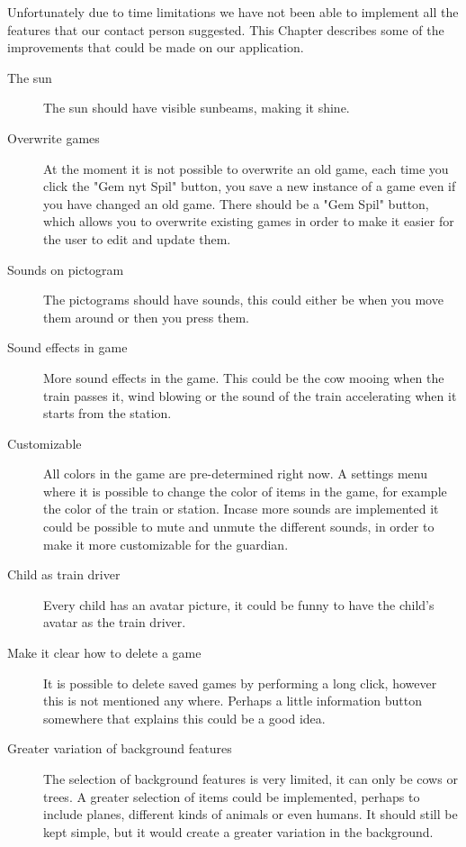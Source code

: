 Unfortunately due to time limitations we have not been able to implement all the features that our contact person suggested. This Chapter describes some of the improvements that could be made on our application.

\begin{description}
\item[The sun] The sun should have visible sunbeams, making it shine. 

\item[Overwrite games] At the moment it is not possible to overwrite an old game, each time you click the "Gem nyt Spil" button, you save a new instance of a game even if you have changed an old game. There should be a "Gem Spil" button, which allows you to overwrite existing games in order to make it easier for the user to edit and update them.

\item[Sounds on pictogram] The pictograms should have sounds, this could either be when you move them around or then you press them. 

\item[Sound effects in game] More sound effects in the game. This could be the cow mooing when the train passes it, wind blowing or the sound of the train accelerating when it starts from the station.

\item[Customizable] All colors in the game are pre-determined right now. A settings menu where it is possible to change the color of items in the game, for example the color of the train or station. Incase more sounds are implemented it could be possible to mute and unmute the different sounds, in order to make it more customizable for the guardian.

\item[Child as train driver] Every child has an avatar picture, it could be funny to have the child's avatar as the train driver. 

\item[Make it clear how to delete a game] It is possible to delete saved games by performing a long click, however this is not mentioned any where. Perhaps a little information button somewhere that explains this could be a good idea. 

\item[Greater variation of background features] The selection of background features is very limited, it can only be cows or trees. A greater selection of items could be implemented, perhaps to include planes, different kinds of animals or even humans. It should still be kept simple, but it would create a greater variation in the background. 


\end{description}
